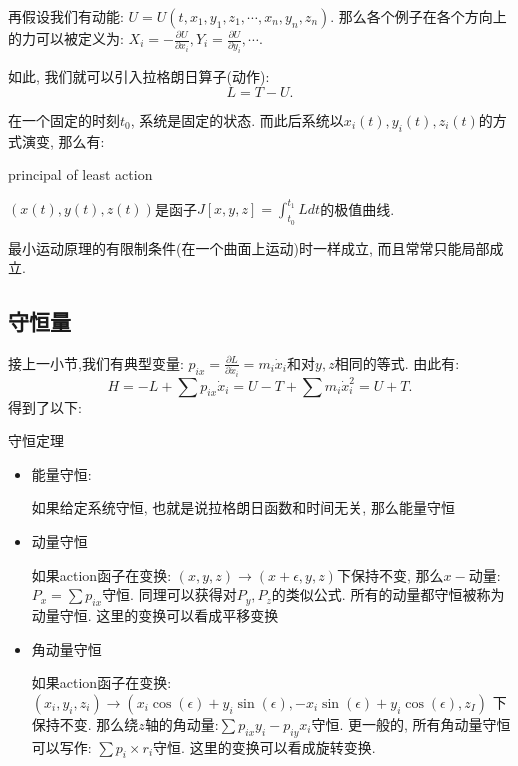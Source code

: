 再假设我们有动能:
\(U = U(t,x_1,y_1,z_1,\cdots,x_n,y_n,z_n)\). 
那么各个例子在各个方向上的力可以被定义为:
\(X_i = -\frac{\partial U}{\partial x_i}, Y_i = \frac{\partial U}{\partial y_i}, \cdots\). 

如此, 我们就可以引入拉格朗日算子(动作): 
\[L = T - U.\]

在一个固定的时刻\(t_0\), 系统是固定的状态. 
而此后系统以\(x_i(t),y_i(t),z_i(t)\)的方式演变, 那么有:
\begin{thm}principal of least action

    \((x(t),y(t),z(t))\)是函子\(J[x,y,z] = \int_{t_0}^{t_1} L dt\)的极值曲线. 
\end{thm}
最小运动原理的有限制条件(在一个曲面上运动)时一样成立, 而且常常只能局部成立. 


\subsection{守恒量}

接上一小节,我们有典型变量: \(p_{ix} = \frac{\partial L}{\partial \dot x_i} = m_i\dot x_i\)和对\(y,z\)相同的等式. 
由此有:
\[H = -L + \sum p_{ix}\dot x_i = U - T + \sum m_i\dot x_i^2 = U + T. \]
得到了以下: 
\begin{thm}守恒定理

    \begin{itemize}
        \item 能量守恒: 
            
            如果给定系统守恒, 也就是说拉格朗日函数和时间无关, 那么能量守恒

        \item 动量守恒

            如果action函子在变换: \((x,y,z)\to (x+\epsilon,y,z)\)下保持不变,
            那么\(x-\)动量: \(P_x = \sum p_{ix}\)守恒. 同理可以获得对\(P_y, P_z\)的类似公式. 
            所有的动量都守恒被称为动量守恒.
            这里的变换可以看成平移变换
        \item 角动量守恒

            如果action函子在变换: 
            \((x_i,y_i,z_i)\to (x_i\cos(\epsilon) + y_i\sin(\epsilon), -x_i\sin(\epsilon) + y_i\cos(\epsilon), z_I)\)
            下保持不变. 那么绕\(z\)轴的角动量:\(\sum p_{ix}y_i - p_{iy}x_i \)守恒.
            更一般的, 所有角动量守恒可以写作: \(\sum p_i \times r_i\)守恒. 
            这里的变换可以看成旋转变换. 
            
    \end{itemize}
\end{thm}


